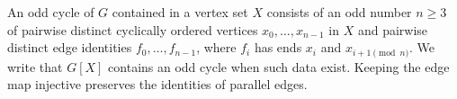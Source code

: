 \begin{definition}
An odd cycle of $G$ contained in a vertex set $X$ consists of an odd number
$n\geq3$ of pairwise distinct cyclically ordered vertices
$x_0,\ldots,x_{n-1}$ in $X$ and pairwise distinct edge identities
$f_0,\ldots,f_{n-1}$, where $f_i$ has ends $x_i$ and
$x_{i+1\pmod n}$.  We write that $G[X]$ contains an odd cycle when such
data exist.  Keeping the edge map injective preserves the identities of
parallel edges.
\end{definition}
